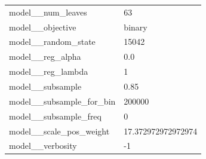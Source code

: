 \begin{tabular}{ll}
model\_\_num\_leaves & 63 \\
model\_\_objective & binary \\
model\_\_random\_state & 15042 \\
model\_\_reg\_alpha & 0.0 \\
model\_\_reg\_lambda & 1 \\
model\_\_subsample & 0.85 \\
model\_\_subsample\_for\_bin & 200000 \\
model\_\_subsample\_freq & 0 \\
model\_\_scale\_pos\_weight & 17.372972972972974 \\
model\_\_verbosity & -1 \\
\bottomrule
\end{tabular}
